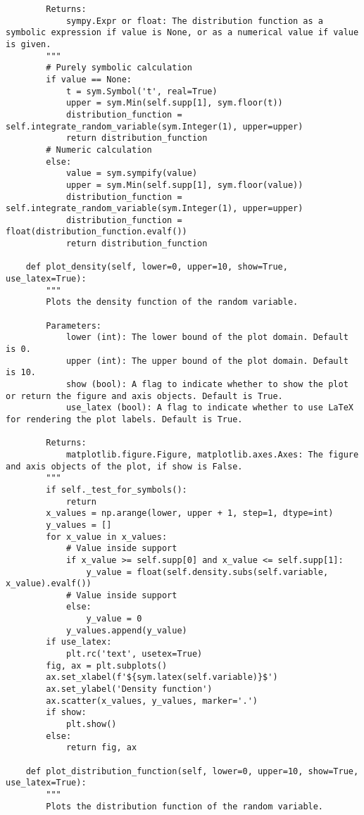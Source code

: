 \begin{small}
\begin{lstlisting}
        Returns:
            sympy.Expr or float: The distribution function as a symbolic expression if value is None, or as a numerical value if value is given.
        """
        # Purely symbolic calculation
        if value == None:
            t = sym.Symbol('t', real=True)
            upper = sym.Min(self.supp[1], sym.floor(t))
            distribution_function = self.integrate_random_variable(sym.Integer(1), upper=upper)
            return distribution_function
        # Numeric calculation
        else:
            value = sym.sympify(value)
            upper = sym.Min(self.supp[1], sym.floor(value))
            distribution_function = self.integrate_random_variable(sym.Integer(1), upper=upper)
            distribution_function = float(distribution_function.evalf())
            return distribution_function

    def plot_density(self, lower=0, upper=10, show=True, use_latex=True):
        """
        Plots the density function of the random variable.

        Parameters:
            lower (int): The lower bound of the plot domain. Default is 0.
            upper (int): The upper bound of the plot domain. Default is 10.
            show (bool): A flag to indicate whether to show the plot or return the figure and axis objects. Default is True.
            use_latex (bool): A flag to indicate whether to use LaTeX for rendering the plot labels. Default is True.

        Returns:
            matplotlib.figure.Figure, matplotlib.axes.Axes: The figure and axis objects of the plot, if show is False.
        """
        if self._test_for_symbols():
            return
        x_values = np.arange(lower, upper + 1, step=1, dtype=int)
        y_values = []
        for x_value in x_values:
            # Value inside support
            if x_value >= self.supp[0] and x_value <= self.supp[1]:
                y_value = float(self.density.subs(self.variable, x_value).evalf())
            # Value inside support
            else:
                y_value = 0
            y_values.append(y_value)
        if use_latex:
            plt.rc('text', usetex=True)
        fig, ax = plt.subplots()
        ax.set_xlabel(f'${sym.latex(self.variable)}$')
        ax.set_ylabel('Density function')
        ax.scatter(x_values, y_values, marker='.')
        if show:
            plt.show()
        else:
            return fig, ax

    def plot_distribution_function(self, lower=0, upper=10, show=True, use_latex=True):
        """
        Plots the distribution function of the random variable.


\end{lstlisting}
\end{small}

